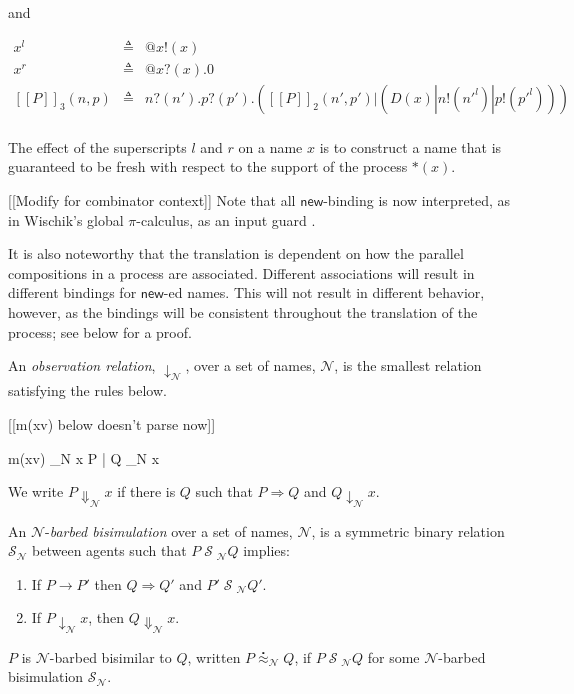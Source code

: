 \documentclass{llncs}
\makeatletter
\newcommand{\new}{\mathsf{new}}
\newcommand{\ldb}{[\![}
\newcommand{\rdb}{]\!]}
\newcommand{\wbbisim}{\stackrel{\centerdot}{\approx}} %
\newcommand{\pzero}{\mathbin{0}}
\newcommand{\nameeq}{\mathbin{\equiv_N}}
\newcommand{\binpar}[2]{#1 | #2}
\newcommand{\outputp}[2]{#1!(#2)}
\newcommand{\prefix}[3]{#1?(#2) . #3}
\newcommand{\quotep}[1]{\mathsf{@}#1}
\newcommand{\meaningof}[1]{\ldb #1 \rdb}
\newcommand{\rel}[1]{\;{\mathcal #1}\;} %
\newcommand{\red}{\rightarrow}
\newcommand{\wred}{\Rightarrow}
\newcommand{\rhoc}{$\rho$-calculus}
\makeatother
\begin{document}
and

\begin{eqnarray*}
  x^l & \triangleq & \quotep{\outputp{x}{x}} \\
  x^r & \triangleq & \quotep{\prefix{x}{x}{\pzero}} \\
  \meaningof{P}_3(n, p) 
    & \triangleq & 
      \prefix{n}{n'}{\prefix{p}{p'}{(\binpar{\meaningof{P}_2(n',p')}
        {(\binpar{D(x)}{\binpar{\outputp{n}{n'^l}}{\outputp{p}{p'^l}}})})}} \\
\end{eqnarray*}

The effect of the superscripts $l$ and $r$ on a name $x$ is to construct a name that is guaranteed to be fresh with respect to the support of the process ${*}(x).$

[[Modify for combinator context]] Note that all $\new$-binding is now interpreted, as in Wischik's
global $\pi$-calculus, as an input guard \cite{globalpi}.

It is also noteworthy that the translation is dependent on how the
parallel compositions in a process are associated. Different
associations will result in different bindings for $\new$-ed
names. This will not result in different behavior, however, as the
bindings will be consistent throughout the translation of the process; see below for a proof.

\begin{definition}
An \emph{observation relation}, $\downarrow_{\mathcal N}$, over a set
of names, $\mathcal N$, is the smallest relation satisfying the rules
below.

[[m(xv) below doesn't parse now]]

\infrule[Out-barb]{y \in {\mathcal N}, \; x \nameeq y}
		  {m(xv) \downarrow_{\mathcal N} x}
		  {\binpar{P}{Q} \downarrow_{\mathcal N} x}

We write $P \Downarrow_{\mathcal N} x$ if there is $Q$ such that 
$P \wred Q$ and $Q \downarrow_{\mathcal N} x$.
\end{definition}


\begin{definition}
An  ${\mathcal N}$-\emph{barbed bisimulation} over a set of names, ${\mathcal N}$, is a symmetric binary relation 
${\mathcal S}_{\mathcal N}$ between agents such that $P\rel{S}_{\mathcal N}Q$ implies:
\begin{enumerate}
\item If $P \red P'$ then $Q \wred Q'$ and $P'\rel{S}_{\mathcal N} Q'$.
\item If $P\downarrow_{\mathcal N} x$, then $Q\Downarrow_{\mathcal N} x$.
\end{enumerate}
$P$ is ${\mathcal N}$-barbed bisimilar to $Q$, written
$P \wbbisim_{\mathcal N} Q$, if $P \rel{S}_{\mathcal N} Q$ for some ${\mathcal N}$-barbed bisimulation ${\mathcal S}_{\mathcal N}$.
\end{definition}
\end{document}

